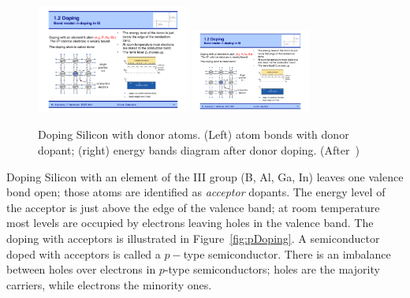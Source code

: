  \begin{figure}[htbp]
   \centering
   \includegraphics[width=0.45\textwidth]{nDopingBonds.pdf} 
   \includegraphics[width=0.35\textwidth]{nDopingBands.pdf} 
   \caption{\label{fig:nDoping}Doping Silicon with donor atoms. (Left) atom bonds with donor dopant; 
   (right) energy bands diagram after donor doping. (After~\cite{Krammer})}
\end{figure}

Doping Silicon with an element of the III group (B, Al, Ga, In) leaves one valence bond open; 
those atoms are identified  as {\it acceptor} dopants. 
The energy level of the acceptor is just above the edge of the valence band; 
at room temperature most levels are occupied by electrons leaving holes in the valence band.  
The doping with acceptors  is illustrated in Figure~\ref{fig:pDoping}. A semiconductor doped with 
acceptors is called a $p-$type semiconductor. There is an imbalance between 
holes over electrons in $p$-type semiconductors; holes are the majority carriers, while electrons the
minority ones.



